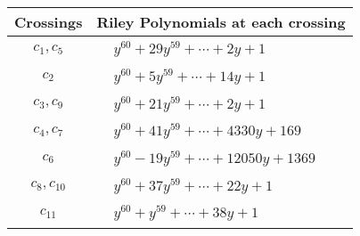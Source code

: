 \documentclass[1p]{elsarticle_modified}
\theoremstyle{definition}
\begin{document}
\begin{tabular}{m{50pt}|m{274pt}}
Crossings & \hspace{64pt}Riley Polynomials at each crossing \\
\hline $$\begin{aligned}c_{1},c_{5}\end{aligned}$$&$\begin{aligned}
&y^{60}+29 y^{59}+\cdots+2 y+1
\end{aligned}$\\
\hline $$\begin{aligned}c_{2}\end{aligned}$$&$\begin{aligned}
&y^{60}+5 y^{59}+\cdots+14 y+1
\end{aligned}$\\
\hline $$\begin{aligned}c_{3},c_{9}\end{aligned}$$&$\begin{aligned}
&y^{60}+21 y^{59}+\cdots+2 y+1
\end{aligned}$\\
\hline $$\begin{aligned}c_{4},c_{7}\end{aligned}$$&$\begin{aligned}
&y^{60}+41 y^{59}+\cdots+4330 y+169
\end{aligned}$\\
\hline $$\begin{aligned}c_{6}\end{aligned}$$&$\begin{aligned}
&y^{60}-19 y^{59}+\cdots+12050 y+1369
\end{aligned}$\\
\hline $$\begin{aligned}c_{8},c_{10}\end{aligned}$$&$\begin{aligned}
&y^{60}+37 y^{59}+\cdots+22 y+1
\end{aligned}$\\
\hline $$\begin{aligned}c_{11}\end{aligned}$$&$\begin{aligned}
&y^{60}+y^{59}+\cdots+38 y+1
\end{aligned}$\\
\hline
\end{tabular}
\vskip 2pc
\end{document}
